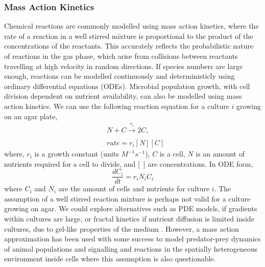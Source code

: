 \begin{multicols}{2}
\subsubsection{Mass Action Kinetics}
Chemical reactions are commonly modelled using mass action kinetics, where the rate of a
reaction in a well stirred mixture is proportional to the product of the concentrations of
the reactants. This accurately reflects the probabilistic nature of reactions in the gas
phase, which arise from collisions between reactants travelling at high velocity in random
directions. If species numbers are large enough, reactions can be modelled continuously
and deterministicly using ordinary differential equations (ODEs). Microbial population
growth, with cell division dependent on nutrient availability, can also be modelled using
mass action kinetics. We can use the following reaction equation for a culture \(i\)
growing on an agar plate,
\begin{subequations}
  \label{eq:9}
  \begin{align}
    &N + C \xrightarrow[]{r_{i}} 2C,\\
    &rate = r_{i}[N][C]
  \end{align}
\end{subequations}
where, \(r_{i}\) is a growth constant (units \(M^{-1}s^{-1}\)), \(C\) is a cell, \(N\) is an amount of nutrients
required for a cell to divide, and [~] are concentrations. In ODE form,
\begin{equation}
  \label{eq:10}
  \frac{dC_{i}}{dt} = r_{i}N_{i}C_{i}
\end{equation}
where \(C_{i}\) and \(N_{i}\) are the amount of cells and nutrients for culture \(i\).
The assumption of a well stirred reaction mixture is perhaps not valid for a culture
growing on agar. We could explore alternatives such as PDE models, if gradients within
cultures are large, or fractal kinetics if nutrient diffusion is limited inside cultures,
due to gel-like properties of the medium \citep{savageau1995,Kopelman1988}. However, a
mass action approximation has been used with some success to model predator-prey dynamics
of animal populations \citep{Berryman1992} and signalling and reactions in the spatially
heterogeneous environment inside cells \citep{Aldridge2006,Chen2010} where this assumption
is also questionable.


\end{multicols}
